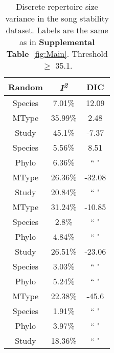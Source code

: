 \documentclass{article}
\begin{document}
  \begin{table}[H]
  \centering
  \caption{Discrete repertoire size variance in the song stability dataset. Labels are the same as in \textbf{Supplemental Table}~\ref{fig:Main}. Threshold $\ge$ 35.1.} 
  \begin{tabular}{ccc}
  \hline
  Random & \textit{I\textsuperscript{2}} & DIC \\ 
  \hline
  Species & 7.01\% & 12.09 \\ \hdashline
  MType & 35.99\% & 2.48 \\ \hdashline
  Study & 45.1\% & -7.37 \\ \hdashline
  Species & 5.56\% & 8.51 \\ 
  Phylo & 6.36\% & `` " \\ \hdashline
  MType & 26.36\% & -32.08 \\ 
  Study & 20.84\% & `` " \\ \hdashline
  MType & 31.24\% & -10.85 \\ 
  Species & 2.8\% & `` " \\ 
  Phylo & 4.84\% & `` " \\ \hdashline
  Study & 26.51\% & -23.06 \\ 
  Species & 3.03\% & `` " \\ 
  Phylo & 5.24\% & `` " \\ \hdashline
  MType & 22.38\% & -45.6 \\ 
  Species & 1.91\% & `` " \\ 
  Phylo & 3.97\% & `` " \\ 
  Study & 18.36\% & `` " \\ 
  \hline
  \end{tabular}
  \end{table}
\end{document}
